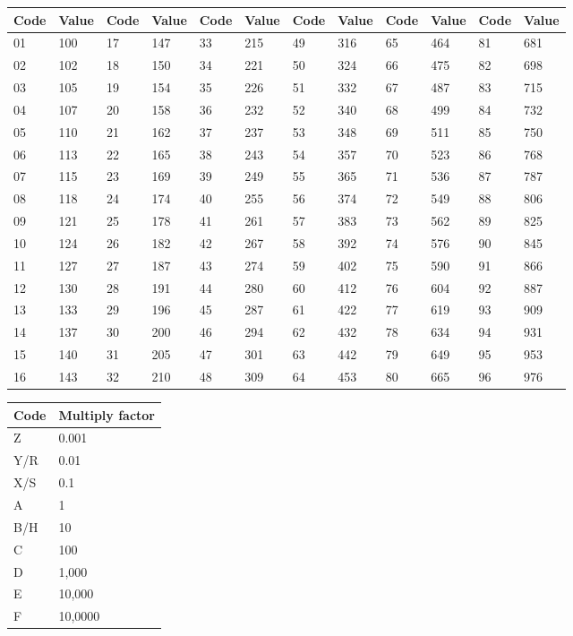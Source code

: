 \noindent
\begin{tabular}{ll||ll||ll||ll||ll||ll}
Code    & Value	& Code	& Value	& Code	& Value	& Code	& Value	& Code	& Value	& Code	& Value\\\hline\hline
01      & 100	& 17	& 147	& 33	& 215	& 49	& 316	& 65	& 464	& 81	& 681\\
02      & 102	& 18	& 150	& 34	& 221	& 50	& 324	& 66	& 475	& 82	& 698\\
03      & 105	& 19	& 154	& 35	& 226	& 51	& 332	& 67	& 487	& 83	& 715\\\hline
04      & 107	& 20	& 158	& 36	& 232	& 52	& 340	& 68	& 499	& 84	& 732\\
05      & 110	& 21	& 162	& 37	& 237	& 53	& 348	& 69	& 511	& 85	& 750\\
06      & 113	& 22	& 165	& 38	& 243	& 54	& 357	& 70	& 523	& 86	& 768\\\hline
07      & 115	& 23	& 169	& 39	& 249	& 55	& 365	& 71	& 536	& 87	& 787\\
08      & 118	& 24	& 174	& 40	& 255	& 56	& 374	& 72	& 549	& 88	& 806\\
09      & 121	& 25	& 178	& 41	& 261	& 57	& 383	& 73	& 562	& 89	& 825\\\hline
10      & 124	& 26	& 182	& 42	& 267	& 58	& 392	& 74	& 576	& 90	& 845\\
11      & 127	& 27	& 187	& 43	& 274	& 59	& 402	& 75	& 590	& 91	& 866\\
12      & 130	& 28	& 191	& 44	& 280	& 60	& 412	& 76	& 604	& 92	& 887\\\hline
13      & 133	& 29	& 196	& 45	& 287	& 61	& 422	& 77	& 619	& 93	& 909\\
14      & 137	& 30	& 200	& 46	& 294	& 62	& 432	& 78	& 634	& 94	& 931\\
15      & 140	& 31	& 205	& 47	& 301	& 63	& 442	& 79	& 649	& 95	& 953\\\hline
16      & 143	& 32	& 210	& 48	& 309	& 64	& 453	& 80	& 665	& 96	& 976\\
\end{tabular}

\noindent
\begin{tabular}{ll}
Code	& Multiply factor\\ \hline
Z       & 0.001\\
Y/R	    & 0.01\\
X/S	    & 0.1\\
A       & 1\\
B/H	    & 10\\
C       & 100\\
D       & 1,000\\
E       & 10,000\\
F       & 10,0000\\
\end{tabular}
